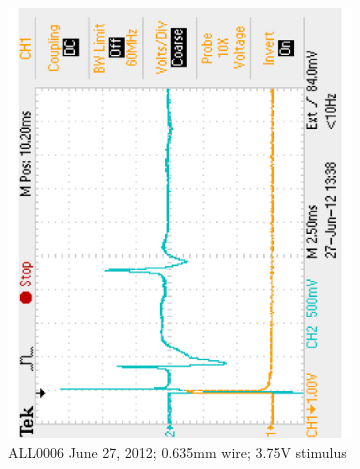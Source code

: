 \begin{figure}[H]
	\centering 
	\begin{singlespace}
	\begin{subfigure}[b]{0.48\textwidth}
		\centering 
		\includegraphics[trim=0 0.1in 0 0.1in,clip,angle=-90,width=\textwidth]{./figures/F0006TEK_22b_120627} %
	\caption{ALL0006 June 27, 2012; 0.635mm wire; 3.75V stimulus}
	\end{subfigure}
	~
	\begin{subfigure}[b]{0.48\textwidth}
		\centering 

\end{subfigure}
\end{singlespace}
\end{figure}

